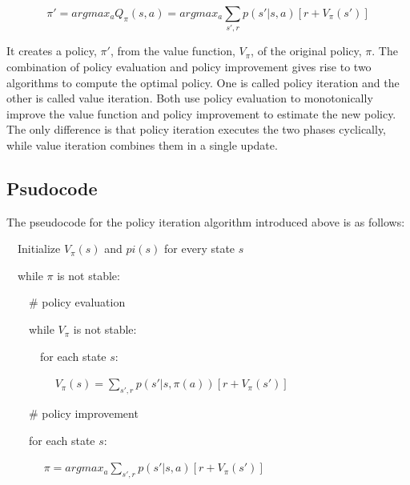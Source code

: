 \begin{equation}
    \pi' = argmax_a Q_\pi(s, a) = argmax_a \sum \limits_{s', r} p(s'|s, a)[r + V_\pi (s')]
\end{equation}

It creates a policy, $\pi'$, from the value function, $V_\pi$, of the original policy, $\pi$.
The combination of policy evaluation and policy improvement gives rise to two algorithms to compute the optimal policy.
One is called policy iteration and the other is called value iteration.
Both use policy evaluation to monotonically improve the value function and policy improvement to estimate the new policy.
The only difference is that policy iteration executes the two phases cyclically, while value iteration combines them in a single update.

\subsection{Psudocode} \label{subsec:q4_pseudocode}

The pseudocode for the policy iteration algorithm introduced above is as follows:

$\quad$Initialize $V_\pi(s)$ and $pi(s)$ for every state $s$

\vspace{5mm}

$\quad$while $\pi$ is not stable:

\vspace{5mm}

$\quad\quad$\# policy evaluation

$\quad\quad$while $V_\pi$ is not stable:

$\quad\quad\quad$for each state $s$:

$\quad\quad\quad\quad$ $ V_\pi (s) = \sum \limits_{s', r} p (s'|s, \pi(a))[r + V_\pi(s')] $

\vspace{5mm}

$\quad\quad$\# policy improvement

$\quad\quad$for each state $s$:

$\quad\quad\quad$ $\pi = argmax_a \sum \limits_{s', r} p(s'|s, a) [r + V_\pi(s')]$